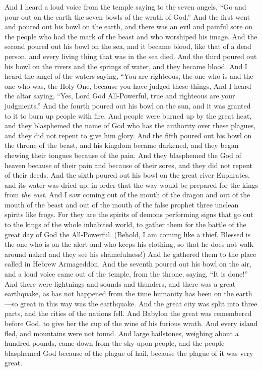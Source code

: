 \begin{biblechapter} %
 And I heard a loud voice from the temple saying to the seven angels, “Go and pour out on the earth the seven bowls of the wrath of God.”
\verse And the first went and poured out his bowl on the earth, and there was an evil and painful sore on the people who had the mark of the beast and who worshiped his image.
\verse And the second poured out his bowl on the sea, and it became blood, like that of a dead person, and every living thing that was in the sea died.
\verse And the third poured out his bowl on the rivers and the springs of water, and they became blood.
\verse And I heard the angel of the waters saying,
\verse “You are righteous, the one who is and the one who was, the Holy One, 
because you have judged these things,
\verse And I heard the altar saying, “Yes, Lord God All-Powerful, 
true and righteous are your judgments.”
\verse And the fourth poured out his bowl on the sun, and it was granted to it to burn up people with fire.
\verse And people were burned up by the great heat, and they blasphemed the name of God who has the authority over these plagues, and they did not repent to give him glory.
\verse And the fifth poured out his bowl on the throne of the beast, and his kingdom became darkened, and they began chewing their tongues because of the pain.
\verse And they blasphemed the God of heaven because of their pain and because of their sores, and they did not repent of their deeds.
\verse And the sixth poured out his bowl on the great river Euphrates, and its water was dried up, in order that the way would be prepared for the kings from \textit{the east}.
\verse And I saw coming out of the mouth of the dragon and out of the mouth of the beast and out of the mouth of the false prophet three unclean spirits like frogs.
\verse For they are the spirits of demons performing signs that go out to the kings of the whole inhabited world, to gather them for the battle of the great day of God the All-Powerful.
\verse (Behold, I am coming like a thief. Blessed is the one who is on the alert and who keeps his clothing, so that he does not walk around naked and they see his shamefulness!)
\verse And he gathered them to the place called in Hebrew Armageddon.
\verse And the seventh poured out his bowl on the air, and a loud voice came out of the temple, from the throne, saying, “It is done!”
\verse And there were lightnings and sounds and thunders, and there was a great earthquake, as has not happened from the time humanity has been on the earth—so great in this way was the earthquake.
\verse And the great city was split into three parts, and the cities of the nations fell. And Babylon the great was remembered before God, to give her the cup of the wine of his furious wrath.
\verse And every island fled, and mountains were not found.
\verse And large hailstones, weighing about a hundred pounds, came down from the sky upon people, and the people blasphemed God because of the plague of hail, because the plague of it was very great.
\end{biblechapter}

